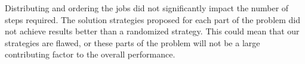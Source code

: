 \documentclass[11pt]{article}
\begin{document}
Distributing and ordering the jobs did not significantly impact the number of steps required. The solution strategies proposed for each part of the problem did not achieve results better than a randomized strategy. This could mean that our strategies are flawed, or these parts of the problem will not be a large contributing factor to the overall performance.



\end{document}
